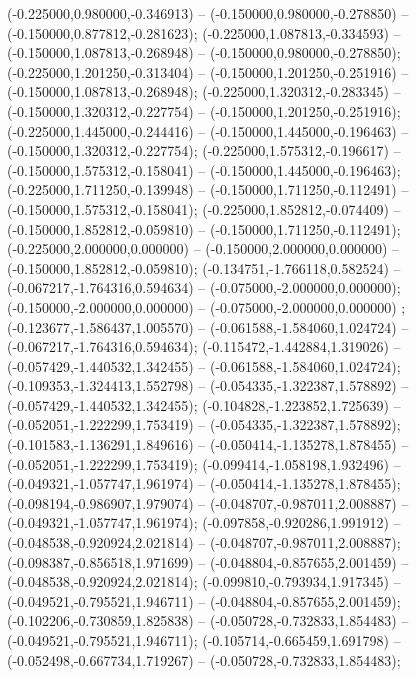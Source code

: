  (-0.225000,0.980000,-0.346913) -- (-0.150000,0.980000,-0.278850) -- (-0.150000,0.877812,-0.281623);
 (-0.225000,1.087813,-0.334593) -- (-0.150000,1.087813,-0.268948) -- (-0.150000,0.980000,-0.278850);
 (-0.225000,1.201250,-0.313404) -- (-0.150000,1.201250,-0.251916) -- (-0.150000,1.087813,-0.268948);
 (-0.225000,1.320312,-0.283345) -- (-0.150000,1.320312,-0.227754) -- (-0.150000,1.201250,-0.251916);
 (-0.225000,1.445000,-0.244416) -- (-0.150000,1.445000,-0.196463) -- (-0.150000,1.320312,-0.227754);
 (-0.225000,1.575312,-0.196617) -- (-0.150000,1.575312,-0.158041) -- (-0.150000,1.445000,-0.196463);
 (-0.225000,1.711250,-0.139948) -- (-0.150000,1.711250,-0.112491) -- (-0.150000,1.575312,-0.158041);
 (-0.225000,1.852812,-0.074409) -- (-0.150000,1.852812,-0.059810) -- (-0.150000,1.711250,-0.112491);
 (-0.225000,2.000000,0.000000) -- (-0.150000,2.000000,0.000000) -- (-0.150000,1.852812,-0.059810);
 (-0.134751,-1.766118,0.582524) -- (-0.067217,-1.764316,0.594634) -- (-0.075000,-2.000000,0.000000);
 (-0.150000,-2.000000,0.000000) -- (-0.075000,-2.000000,0.000000) ;
 (-0.123677,-1.586437,1.005570) -- (-0.061588,-1.584060,1.024724) -- (-0.067217,-1.764316,0.594634);
 (-0.115472,-1.442884,1.319026) -- (-0.057429,-1.440532,1.342455) -- (-0.061588,-1.584060,1.024724);
 (-0.109353,-1.324413,1.552798) -- (-0.054335,-1.322387,1.578892) -- (-0.057429,-1.440532,1.342455);
 (-0.104828,-1.223852,1.725639) -- (-0.052051,-1.222299,1.753419) -- (-0.054335,-1.322387,1.578892);
 (-0.101583,-1.136291,1.849616) -- (-0.050414,-1.135278,1.878455) -- (-0.052051,-1.222299,1.753419);
 (-0.099414,-1.058198,1.932496) -- (-0.049321,-1.057747,1.961974) -- (-0.050414,-1.135278,1.878455);
 (-0.098194,-0.986907,1.979074) -- (-0.048707,-0.987011,2.008887) -- (-0.049321,-1.057747,1.961974);
 (-0.097858,-0.920286,1.991912) -- (-0.048538,-0.920924,2.021814) -- (-0.048707,-0.987011,2.008887);
 (-0.098387,-0.856518,1.971699) -- (-0.048804,-0.857655,2.001459) -- (-0.048538,-0.920924,2.021814);
 (-0.099810,-0.793934,1.917345) -- (-0.049521,-0.795521,1.946711) -- (-0.048804,-0.857655,2.001459);
 (-0.102206,-0.730859,1.825838) -- (-0.050728,-0.732833,1.854483) -- (-0.049521,-0.795521,1.946711);
 (-0.105714,-0.665459,1.691798) -- (-0.052498,-0.667734,1.719267) -- (-0.050728,-0.732833,1.854483);
